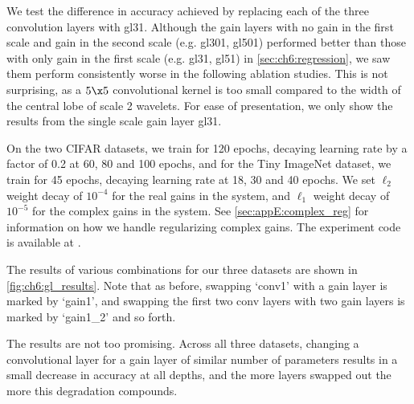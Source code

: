 We test the difference in accuracy achieved by replacing each of the three
convolution layers with gl31.
Although the gain layers with no gain in the first scale and gain in the second
scale (e.g. gl301, gl501) performed better than those with only gain in the first scale (e.g. gl31, gl51)
in \autoref{sec:ch6:regression}, we saw them perform consistently worse in the
following ablation studies. This is not surprising, as a $5\x 5$ convolutional
kernel is too small compared to the width of the central lobe of scale 2
wavelets. For ease of presentation, we only show the results from the single
scale gain layer gl31.

On the two CIFAR datasets, we train for 120 epochs, decaying learning rate by a
factor of 0.2 at 60, 80 and 100 epochs, and for the Tiny ImageNet dataset, we
train for 45 epochs, decaying learning rate at 18, 30 and 40 epochs. We set
$\ell_2$ weight decay of $10^{-4}$ for the real gains in the system,
and $\ell_1$ weight decay of $10^{-5}$ for the complex gains in the system.
See
\autoref{sec:appE:complex_reg} for information on how we handle regularizing complex
gains. The experiment code is available at \cite{cotter_dtcwt_2018}.

The results of various combinations for our three datasets are shown in
\autoref{fig:ch6:gl_results}.
Note that as before, swapping `conv1' with a gain layer is marked by `gain1',
and swapping the first two conv layers with two gain layers is marked by
`gain1\_2' and so forth.

The results are not too promising. Across all three datasets, changing a
convolutional layer for a gain layer of similar number of parameters
results in a small decrease in accuracy at all depths, and the more layers
swapped out the more this degradation compounds.

\begin{figure}
  \centering
  \\
  \\
  \label{fig:ch6:gl_results}
\end{figure}

